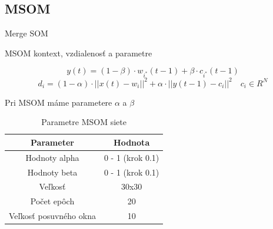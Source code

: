 \documentclass[10pt]{beamer}
\begin{document}
\subsection{MSOM}
\begin{frame}[fragile]{Merge SOM}

  \begin{block}{MSOM kontext, vzdialenosť a parametre}
    
    \begin{equation}
      y(t) = (1 - \beta) \cdot w_{i^{*}}(t-1) + \beta \cdot c_{i^{*}}(t-1)
    \end{equation}
    \begin{equation*}
      d_i = (1 - \alpha) \cdot ||x(t) - w_i||^{2} + \alpha \cdot ||y(t-1) - c_i||^{2} \quad c_{i} \in R^{N}
    \end{equation*}

    Pri MSOM máme parametere $\alpha$ a $\beta$

  \end{block}

    \begin{table}[h!]
      \centering
      \begin{tabular}{|c|c|} 
       \hline
       Parameter & Hodnota \\ 
       \hline\hline
       Hodnoty alpha & 0 - 1 (krok 0.1)  \\ 
       \hline
       Hodnoty beta & 0 - 1  (krok 0.1) \\ 
       \hline
       Veľkosť & 30x30  \\
       \hline
       Počet epôch & 20  \\
       \hline
       Veľkosť posuvného okna & 10  \\
       \hline
      \end{tabular}
      \caption{Parametre MSOM siete}
    \end{table}
  
\end{frame}
\end{document}
